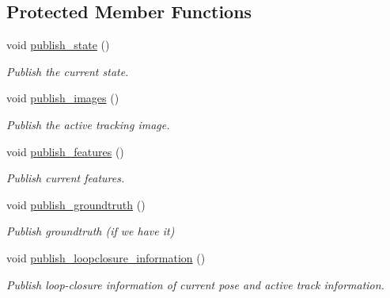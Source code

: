 \subsection*{Protected Member Functions}
\begin{DoxyCompactItemize}
\item 
\mbox{\label{classov__msckf_1_1ROS1Visualizer_aa1960cf9554976e0cd0d7bae5f13658c}} 
void \hyperlink{classov__msckf_1_1ROS1Visualizer_aa1960cf9554976e0cd0d7bae5f13658c}{publish\+\_\+state} ()
\begin{DoxyCompactList}\small\item\em Publish the current state. \end{DoxyCompactList}\item 
\mbox{\label{classov__msckf_1_1ROS1Visualizer_accfd5dbc7c5d646152eaa21694ac7e73}} 
void \hyperlink{classov__msckf_1_1ROS1Visualizer_accfd5dbc7c5d646152eaa21694ac7e73}{publish\+\_\+images} ()
\begin{DoxyCompactList}\small\item\em Publish the active tracking image. \end{DoxyCompactList}\item 
\mbox{\label{classov__msckf_1_1ROS1Visualizer_a38e20e3c610668aa902f18d70b5f55cb}} 
void \hyperlink{classov__msckf_1_1ROS1Visualizer_a38e20e3c610668aa902f18d70b5f55cb}{publish\+\_\+features} ()
\begin{DoxyCompactList}\small\item\em Publish current features. \end{DoxyCompactList}\item 
\mbox{\label{classov__msckf_1_1ROS1Visualizer_af5c658c203ebb405da10710491fcd5e1}} 
void \hyperlink{classov__msckf_1_1ROS1Visualizer_af5c658c203ebb405da10710491fcd5e1}{publish\+\_\+groundtruth} ()
\begin{DoxyCompactList}\small\item\em Publish groundtruth (if we have it) \end{DoxyCompactList}\item 
\mbox{\label{classov__msckf_1_1ROS1Visualizer_a1acd1fa8c3f57152ac75211553ecb536}} 
void \hyperlink{classov__msckf_1_1ROS1Visualizer_a1acd1fa8c3f57152ac75211553ecb536}{publish\+\_\+loopclosure\+\_\+information} ()
\begin{DoxyCompactList}\small\item\em Publish loop-\/closure information of current pose and active track information. \end{DoxyCompactList}\end{DoxyCompactItemize}
